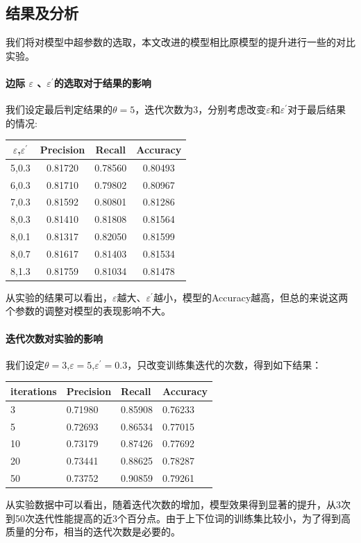 \documentclass[a4paper,13pt]{article}
\begin{document}
\begin{spacing}{1.5}
\subsection{结果及分析}

我们将对模型中超参数的选取，本文改进的模型相比原模型的提升进行一些的对比实验。

\paragraph {边际 $\varepsilon$ 、$\varepsilon^{'}$的选取对于结果的影响}

我们设定最后判定结果的$\theta=5$，迭代次数为3，分别考虑改变$\varepsilon$和$\varepsilon^{'}$对于最后结果的情况:
\begin{center}
\begin{tabular}{| c | c | c | c |}
	\hline
	$\varepsilon$,$\varepsilon^{'}$ & Precision & Recall & Accuracy \\
	\hline
	5,0.3 & 0.81720 & 0.78560 & 0.80493 \\
	\hline
	6,0.3 & 0.81710 & 0.79802 & 0.80967 \\
	\hline
	7,0.3 & 0.81592 & 0.80801 & 0.81286 \\
	\hline
	8,0.3 & 0.81410 & 0.81808 & 0.81564 \\
	\hline
	8,0.1 & 0.81317 & 0.82050 & 0.81599 \\
	\hline
	8,0.7 & 0.81617 & 0.81403 & 0.81534 \\
	\hline
	8,1.3 & 0.81759 & 0.81034 & 0.81478 \\
	\hline
\end{tabular}
\end{center}
从实验的结果可以看出，$\varepsilon$越大、$\varepsilon^{'}$越小，模型的Accuracy越高，但总的来说这两个参数的调整对模型的表现影响不大。

\paragraph{迭代次数对实验的影响}
 
我们设定$\theta=3$,$\varepsilon=5$,$\varepsilon^{'}=0.3$，只改变训练集迭代的次数，得到如下结果：
\begin{center}
\begin{tabular}{| l | l | l | l |}
	\hline
	iterations & Precision & Recall & Accuracy \\
	\hline
	3 & 0.71980 & 0.85908 & 0.76233 \\
	\hline
	5 & 0.72693 & 0.86534 & 0.77015 \\
	\hline
	10 & 0.73179 & 0.87426 & 0.77692 \\
	\hline
	20 & 0.73441 & 0.88625 & 0.78287 \\
	\hline
	50 & 0.73752 & 0.90859 & 0.79261 \\
	\hline
\end{tabular}
\end{center}
从实验数据中可以看出，随着迭代次数的增加，模型效果得到显著的提升，从3次到50次迭代性能提高的近3个百分点。由于上下位词的训练集比较小，为了得到高质量的分布，相当的迭代次数是必要的。


\end{spacing}
\end{document}
